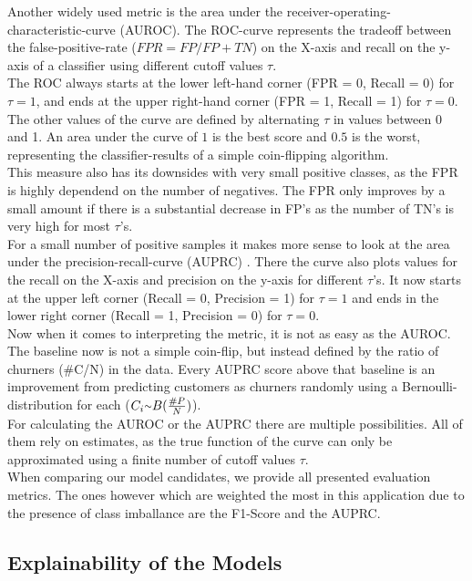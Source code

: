 \documentclass[12pt,titlepage]{article}
\begin{document}
\noindent
Another widely used metric is the area under the receiver-operating-characteristic-curve (AUROC). The ROC-curve represents the tradeoff between the false-positive-rate ($FPR=FP/FP+TN$) on the X-axis and recall on the y-axis of a classifier using different cutoff values $\tau$. \\
The ROC always starts at the lower left-hand corner (FPR = 0, Recall = 0) for $\tau=1$, and ends at the upper right-hand corner (FPR = 1, Recall = 1) for $\tau=0$. The other values of the curve are defined by alternating $\tau$ in values between 0 and 1. An area under the curve of $1$ is the best score and $0.5$ is the worst, representing the classifier-results of a simple coin-flipping algorithm. \\
This measure also has its downsides with very small positive classes, as the FPR is highly dependend on the number of negatives. The FPR only improves by a small amount if there is a substantial decrease in FP's as the number of TN's is very high for most $\tau$'s. \\
For a small number of positive samples it makes more sense to look at the area under the precision-recall-curve (AUPRC) \cite{auprc}. There the curve also plots values for the recall on the X-axis and precision on the y-axis for different $\tau$'s. It now starts at the upper left corner (Recall = 0, Precision = 1) for $\tau=1$ and ends in the lower right corner (Recall = 1, Precision = 0) for $\tau=0$. \\
Now when it comes to interpreting the metric, it is not as easy as the AUROC. The baseline now is not a simple coin-flip, but instead defined by the ratio of churners (\#C/N) in the data. Every AUPRC score above that baseline is an improvement from predicting customers as churners randomly using a Bernoulli-distribution for each ($C_{i}{\raise.17ex\hbox{$\scriptstyle\mathtt{\sim}$}} B(\frac{\#P}{N})$). \\
For calculating the AUROC or the AUPRC there are multiple possibilities. All of them rely on estimates, as the true function of the curve can only be approximated using a finite number of cutoff values $\tau$. \\

When comparing our model candidates, we provide all presented evaluation metrics. The ones however which are weighted the most in this application due to the presence of class imballance are the F1-Score and the AUPRC. \\

\subsection{Explainability of the Models} \par
\label{section:interpreting}
\end{document}
